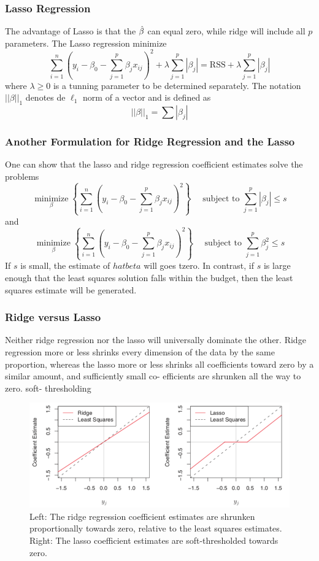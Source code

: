 \subsubsection{Lasso Regression}
The advantage of Lasso is that the $\hat{\beta}$ can equal zero, while ridge will include all $p$ parameters.
The Lasso regression minimize
\[ \sum_{i=1}^{n}\left(y_{i}-\beta_{0}-\sum_{j=1}^{p} \beta_{j} x_{i j}\right)^{2}+\lambda \sum_{j=1}^{p}\left|\beta_{j}\right|=\mathrm{RSS}+\lambda \sum_{j=1}^{p}\left|\beta_{j}\right| \]
where $\lambda \geq 0$ is a tunning parameter to be determined separately. The notation $||\beta||_1$ denotes de $\ell_1$ norm of a vector and is defined as
\[ ||\beta||_1 = \sum |\beta_j| \]

\subsubsection{Another Formulation for Ridge Regression and the Lasso}
One can show that the lasso and ridge regression coefficient estimates solve the problems
\[ \underset{\beta}{\operatorname{minimize}}\left\{\sum_{i=1}^{n}\left(y_{i}-\beta_{0}-\sum_{j=1}^{p} \beta_{j} x_{i j}\right)^{2}\right\} \quad \text { subject to } \sum_{j=1}^{p}\left|\beta_{j}\right| \leq s \]
and 
\[ \underset{\beta}{\operatorname{minimize}}\left\{\sum_{i=1}^{n}\left(y_{i}-\beta_{0}-\sum_{j=1}^{p} \beta_{j} x_{i j}\right)^{2}\right\} \quad \text { subject to } \sum_{j=1}^{p}\beta_{j}^2 \leq s \]
If $s$ is small, the estimate of $hatbeta$ will goes tzero. In contrast, if $s$ is large enough that the least squares solution falls within the budget, then the least squares estimate will be generated. 


\subsubsection{Ridge versus Lasso}
Neither ridge regression nor the lasso will universally dominate the other.
Ridge regression more or less shrinks every dimension of the data by the same proportion, whereas the lasso more or less shrinks all coefficients toward zero by a similar amount, and sufficiently small co- efficients are shrunken all the way to zero.
soft- thresholding
\begin{figure}[!ht]
    \centering
    \includegraphics[scale=0.5]{src/StatisticalLearning/Lasso-VS-Ridge.png}
    \caption{Left: The ridge regression coefficient estimates are shrunken proportionally towards zero, relative to the least squares estimates. Right: The lasso coefficient estimates are soft-thresholded towards zero. }
\end{figure}

